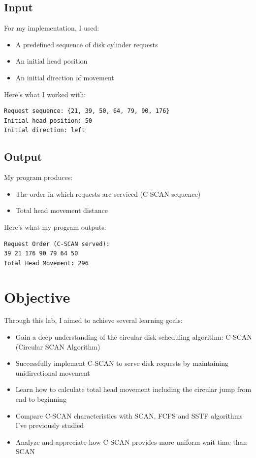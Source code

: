 \documentclass[12pt,a4paper]{article}
\begin{document}
\subsection*{Input}
For my implementation, I used:
\begin{itemize}
  \item A predefined sequence of disk cylinder requests
  \item An initial head position
  \item An initial direction of movement
\end{itemize}

Here's what I worked with:
\begin{verbatim}
Request sequence: {21, 39, 50, 64, 79, 90, 176}
Initial head position: 50
Initial direction: left
\end{verbatim}

\subsection*{Output}
My program produces:
\begin{itemize}
  \item The order in which requests are serviced (C-SCAN sequence)
  \item Total head movement distance
\end{itemize}

Here's what my program outputs:
\begin{verbatim}
Request Order (C-SCAN served):
39 21 176 90 79 64 50
Total Head Movement: 296
\end{verbatim}

\section{Objective}
Through this lab, I aimed to achieve several learning goals:
\begin{itemize}
    \item Gain a deep understanding of the circular disk scheduling algorithm: C-SCAN (Circular SCAN Algorithm)
    \item Successfully implement C-SCAN to serve disk requests by maintaining unidirectional movement
    \item Learn how to calculate total head movement including the circular jump from end to beginning
    \item Compare C-SCAN characteristics with SCAN, FCFS and SSTF algorithms I've previously studied
    \item Analyze and appreciate how C-SCAN provides more uniform wait time than SCAN
\end{itemize}
\end{document}
